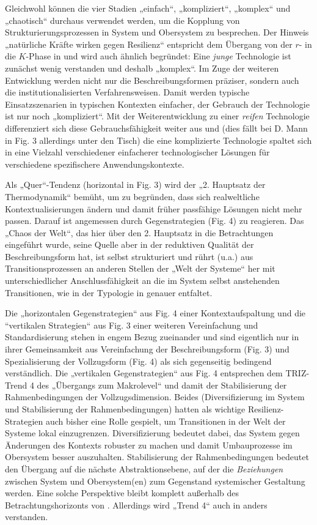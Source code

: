 \documentclass[12pt,a4paper]{article}
\begin{document}
Gleichwohl können die vier Stadien „einfach“, „kompliziert“, „komplex“ und
„chaotisch“ durchaus verwendet werden, um die Kopplung von
Strukturierungsprozessen in System und Obersystem zu besprechen.  Der Hinweis
„natürliche Kräfte wirken gegen Resilienz“ \cite[Fig. 3]{Mann2019} entspricht
dem Übergang von der $r$- in die $K$-Phase in \cite{Holling2001} und wird auch
ähnlich begründet: Eine \emph{junge} Technologie ist zunächst wenig verstanden
und deshalb „komplex“. Im Zuge der weiteren Entwicklung werden nicht nur die
Beschreibungsformen präziser, sondern auch die institutionalisierten
Verfahrensweisen. Damit werden typische Einsatzszenarien in typischen
Kontexten einfacher, der Gebrauch der Technologie ist nur noch „kompliziert“.
Mit der Weiterentwicklung zu einer \emph{reifen} Technologie differenziert
sich diese Gebrauchsfähigkeit weiter aus und (dies fällt bei D. Mann in Fig. 3
allerdings unter den Tisch) die eine komplizierte Technologie spaltet sich in
eine Vielzahl verschiedener einfacherer technologischer Lösungen für
verschiedene spezifischere Anwendungskontexte.

Als „Quer“-Tendenz (horizontal in Fig. 3) wird der „2. Hauptsatz der
Thermodynamik“ bemüht, um zu begründen, dass sich realweltliche
Kontextualisierungen ändern und damit früher passfähige Lösungen nicht mehr
passen.  Darauf ist angemessen durch Gegenstrategien (Fig. 4) zu reagieren.
Das „Chaos der Welt“, das hier über den 2. Hauptsatz in die Betrachtungen
eingeführt wurde, seine Quelle aber in der reduktiven Qualität der
Beschreibungsform hat, ist selbst strukturiert und rührt (u.a.) aus
Transitionsprozessen an anderen Stellen der „Welt der Systeme“ her mit
unterschiedlicher Anschlussfähigkeit an die im System selbst anstehenden
Transitionen, wie in der Typologie in \cite{Geels2007} genauer entfaltet.

Die „horizontalen Gegenstrategien“ aus Fig. 4 einer Kontextaufspaltung und die
“vertikalen Strategien“ aus Fig. 3 einer weiteren Vereinfachung und
Standardisierung stehen in engem Bezug zueinander und sind eigentlich nur in
ihrer Gemeinsamkeit aus Vereinfachung der Beschreibungsform (Fig. 3) und
Spezialisierung der Vollzugsform (Fig. 4) als sich gegenseitig bedingend
verständlich. Die „vertikalen Gegenstrategien“ aus Fig. 4 entsprechen dem
TRIZ-Trend 4 des „Übergangs zum Makrolevel“ \cite{TESE2018} und damit der
Stabilisierung der Rahmenbedingungen der Vollzugsdimension. Beides
(Diversifizierung im System und Stabilisierung der Rahmenbedingungen) hatten
als wichtige Resilienz-Strategien auch bisher eine Rolle gespielt, um
Transitionen in der Welt der Systeme lokal einzugrenzen. Diversifizierung
bedeutet dabei, das System gegen Änderungen des Kontexts robuster zu machen
und damit Umbauprozesse im Obersystem besser auszuhalten.  Stabilisierung der
Rahmenbedingungen bedeutet den Übergang auf die nächste Abstraktionsebene, auf
der die \emph{Beziehungen} zwischen System und Obersystem(en) zum Gegenstand
systemischer Gestaltung werden. Eine solche Perspektive bleibt komplett
außerhalb des Betrachtungshorizonts von \cite{Mann2019}.  Allerdings wird
„Trend 4“ auch in \cite{TESE2018} anders verstanden.
\end{document}
